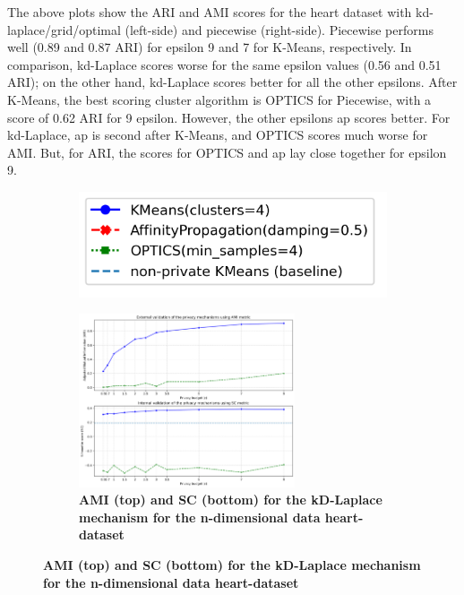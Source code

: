 The above plots show the ARI and AMI scores for the heart dataset with kd-laplace/grid/optimal (left-side) and piecewise (right-side).
Piecewise performs well (0.89 and 0.87 ARI) for epsilon 9 and 7 for K-Means, respectively.
In comparison, kd-Laplace scores worse for the same epsilon values (0.56 and 0.51 ARI); on the other hand, kd-Laplace scores better for all the other epsilons.
After K-Means, the best scoring cluster algorithm is OPTICS for Piecewise, with a score of 0.62 ARI for 9 epsilon.
However, the other epsilons \gls{ap} scores better. For kd-Laplace, \gls{ap} is second after K-Means, and OPTICS scores much worse for AMI.
But, for ARI, the scores for OPTICS and \gls{ap} lay close together for epsilon 9.
\newpage
\begin{figure}[H]
    \centering
    \begin{subfigure}{0.30\textwidth}
        \includegraphics[width=\textwidth]{Results/2d-laplace/seeds-dataset/legend.png}
    \end{subfigure}
    \begin{subfigure}{1\textwidth}
        \centering
        \includegraphics[width=0.70\textwidth]{Results/kd-laplace/kd-Laplace/heart-dataset/ami-and-sc_10_dimensions.png}
        \centering
        \caption{\textbf{AMI (top) and SC (bottom) for the kD-Laplace mechanism for the n-dimensional data heart-dataset}}
    \end{subfigure}

\end{figure}

